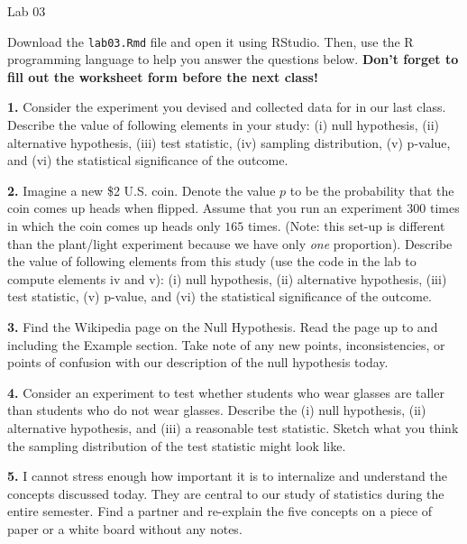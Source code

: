 \documentclass{tufte-handout}
\begin{document}
\justify

{\LARGE Lab 03}

\vspace*{18pt}

Download the \texttt{lab03.Rmd} file and open it using RStudio. Then, use the
R programming language to help you answer the questions below. \textbf{Don't
forget to fill out the worksheet form before the next class!}

\vspace*{12pt}

\textbf{1.} Consider the experiment you devised and collected data for in our
last class. Describe the value of following elements in your study:
(i) null hypothesis, (ii) alternative hypothesis, (iii) test statistic,
(iv) sampling distribution, (v) p-value, and (vi) the statistical significance
of the outcome.

\textbf{2.} Imagine a new \$2 U.S. coin. Denote the value $p$ to be the
probability that the coin comes up heads when flipped. Assume that you run an
experiment $300$ times in which the coin comes up heads only $165$ times.
(Note: this set-up is different than the plant/light experiment because we have
only \textit{one} proportion). Describe the value of following elements from
this study (use the code in the lab to compute elements iv and v): (i) null
hypothesis, (ii) alternative hypothesis, (iii) test statistic, (v) p-value,
and (vi) the statistical significance of the outcome.

\textbf{3.} Find the Wikipedia page on the Null Hypothesis. Read the page up
to and including the Example section. Take note of any new points,
inconsistencies, or points of confusion with our description of the null
hypothesis today.

\textbf{4.} Consider an experiment to test whether students who wear glasses
are taller than students who do not wear glasses. Describe the
(i) null hypothesis, (ii) alternative hypothesis, and (iii) a reasonable
test statistic. Sketch what you think the sampling distribution of the test
statistic might look like.

\textbf{5.} I cannot stress enough how important it is to internalize and
understand the concepts discussed today. They are central to our study of
statistics during the entire semester. Find a partner and re-explain the
five concepts on a piece of paper or a white board without any notes.
\end{document}
